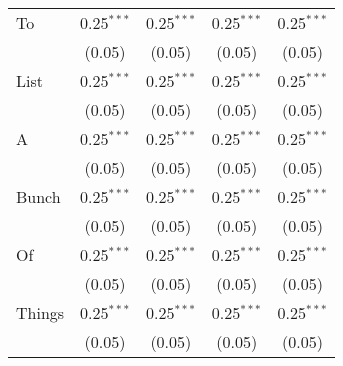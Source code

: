 \begin{spacing}{1}
{\begin{longtable}{lcccc}
 			To & 0.25$^{***}$ & 0.25$^{***}$ & 0.25$^{***}$ & 0.25$^{***}$ \\
 			&	(0.05)	&	(0.05)	&	(0.05)	&	(0.05) \\	 	
 			List & 0.25$^{***}$ & 0.25$^{***}$ & 0.25$^{***}$ & 0.25$^{***}$ \\
 			&	(0.05)	&	(0.05)	&	(0.05)	&	(0.05) \\	 	
 			A & 0.25$^{***}$ & 0.25$^{***}$ & 0.25$^{***}$ & 0.25$^{***}$ \\
 			&	(0.05)	&	(0.05)	&	(0.05)	&	(0.05) \\	 
 			Bunch & 0.25$^{***}$ & 0.25$^{***}$ & 0.25$^{***}$ & 0.25$^{***}$ \\
 			&	(0.05)	&	(0.05)	&	(0.05)	&	(0.05) \\	 
 			Of & 0.25$^{***}$ & 0.25$^{***}$ & 0.25$^{***}$ & 0.25$^{***}$ \\
 			&	(0.05)	&	(0.05)	&	(0.05)	&	(0.05) \\	 	 
 			Things & 0.25$^{***}$ & 0.25$^{***}$ & 0.25$^{***}$ & 0.25$^{***}$ \\
 			&	(0.05)	&	(0.05)	&	(0.05)	&	(0.05) \\	 								
 		\end{longtable}}
  \end{spacing} 
 	
